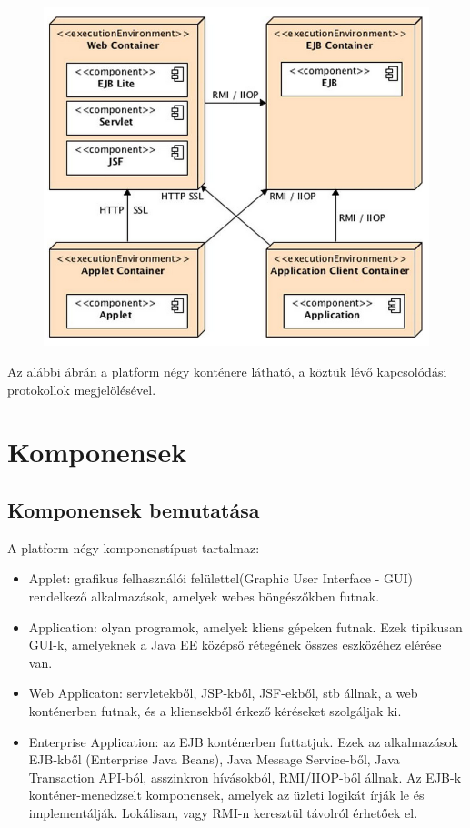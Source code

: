 \documentclass[centeredchapter]{thesis-ekf}
\theoremstyle{definition}
\theoremstyle{remark}
\begin{document}
\begin{figure}[!h]
	\centering
	\includegraphics[width=14cm]{kontenerek.png}
\end{figure}

Az alábbi ábrán a platform négy konténere látható, a köztük lévő kapcsolódási protokollok megjelölésével.

\section{Komponensek}

\subsection{Komponensek bemutatása}
A platform négy komponenstípust tartalmaz:
\begin{itemize}
	\item Applet: grafikus felhasználói felülettel(Graphic User Interface - GUI) rendelkező alkalmazások, amelyek webes böngészőkben futnak.
	
	\item Application: olyan programok, amelyek kliens gépeken futnak. Ezek tipikusan GUI-k, amelyeknek a Java EE középső rétegének összes eszközéhez elérése van.
	
	\item Web Applicaton: servletekből, JSP-kből, JSF-ekből, stb állnak, a web konténerben futnak, és a kliensekből érkező kéréseket szolgáljak ki.
	
	\item Enterprise Application: az EJB konténerben futtatjuk. Ezek az alkalmazások EJB-kből (Enterprise Java Beans), Java Message Service-ből, Java Transaction API-ból, asszinkron hívásokból, RMI/IIOP-ből állnak. Az EJB-k konténer-menedzselt komponensek, amelyek az üzleti logikát írják le és implementálják. Lokálisan, vagy RMI-n keresztül távolról érhetőek el. 
	
\end{itemize} 
\end{document}
